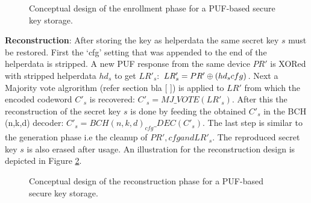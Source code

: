 \begin{figure}
\centering
{}
\caption{Conceptual design of the enrollment phase for a PUF-based secure key storage.}
\label{img:fz_2}
\end{figure}

\textbf{Reconstruction}: After storing the key as helperdata the same secret key $s$ must be restored. First the `cfg' setting that was appended to the end of the helperdata is stripped. A new PUF response from the same device $PR'$ is XORed with stripped helperdata $hd_s$ to get $LR'_s$: $LR'_s = PR' \mathbin{\oplus} (hd_s\\cfg)$. Next a Majority vote algrorithm (refer section bla [ ]) is applied to $LR'$ from which the encoded codeword $C'_s$ is recovered: $C'_s = MJ\_VOTE(LR'_s)$. After this the
reconstruction of the secret key $s$ is done by feeding the obtained $C'_s$ in the BCH (n,k,d) decoder: $C'_s = BCH(n,k,d)_{cfg}\_DEC(C'_s)$. The last step is similar to the generation phase i.e the cleanup of $PR', cfg and LR'_s$. The reproduced secret key $s$ is also erased after usage. An illustration for the reconstruction design is depicted in Figure \ref{img:fz_3}.

\begin{figure}
\centering
{}
\caption{Conceptual design of the reconstruction phase for a PUF-based secure key storage.}
\label{img:fz_3}
\end{figure}
